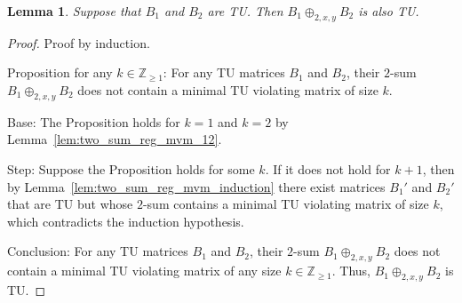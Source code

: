 \documentclass{article}
\newtheorem{lemma}{Lemma}
\theoremstyle{definition}
\begin{document}
\begin{lemma}
    Suppose that $B_{1}$ and $B_{2}$ are TU. Then $B_{1} \oplus_{2, x, y} B_{2}$ is also TU.
\end{lemma}

\begin{proof}
    Proof by induction.

    Proposition for any $k \in \mathbb{Z}_{\geq 1}$: For any TU matrices $B_{1}$ and $B_{2}$, their $2$-sum $B_{1} \oplus_{2, x, y} B_{2}$ does not contain a minimal TU violating matrix of size $k$.

    Base: The Proposition holds for $k = 1$ and $k = 2$ by Lemma~\ref{lem:two_sum_reg_mvm_12}.

    Step: Suppose the Proposition holds for some $k$. If it does not hold for $k + 1$, then by Lemma~\ref{lem:two_sum_reg_mvm_induction} there exist matrices $B_{1}'$ and $B_{2}'$ that are TU but whose $2$-sum contains a minimal TU violating matrix of size $k$, which contradicts the induction hypothesis.

    Conclusion: For any TU matrices $B_{1}$ and $B_{2}$, their $2$-sum $B_{1} \oplus_{2, x, y} B_{2}$ does not contain a minimal TU violating matrix of any size $k \in \mathbb{Z}_{\geq 1}$. Thus, $B_{1} \oplus_{2, x, y} B_{2}$ is TU.
\end{proof}
\end{document}
